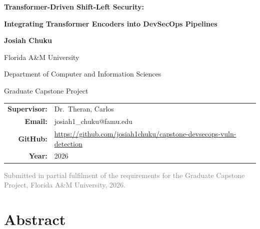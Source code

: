 \documentclass[12pt, letterpaper]{article}
\begin{document}
\begin{titlepage}
\centering\vspace*{2cm}
{\Huge\bfseries\color{navyblue} Transformer-Driven Shift-Left Security:\par}
\vspace{0.5cm}
{\LARGE\bfseries\color{navyblue}
  Integrating Transformer Encoders into DevSecOps Pipelines\par}
\vspace{2cm}
{\large\bfseries Josiah Chuku\par}\vspace{0.3cm}
{\large Florida A\&M University\par}
{\large Department of Computer and Information Sciences\par}
{\large Graduate Capstone Project\par}
\vspace{1.5cm}
{\normalsize\begin{tabular}{rl}
  \textbf{Supervisor:} & Dr.\ Theran, Carlos \\[6pt]
  \textbf{Email:}      & josiah1\_chuku@famu.edu \\[6pt]
  \textbf{GitHub:}     &
    \url{https://github.com/josiah1chuku/capstone-devsecops-vuln-detection} \\[6pt]
  \textbf{Year:}       & 2026 \\
\end{tabular}\par}
\vfill
{\small\textcolor{gray}{Submitted in partial fulfilment of the requirements
  for the Graduate Capstone Project, Florida A\&M University, 2026.}\par}
\end{titlepage}

\tableofcontents\newpage
\listoffigures\listoftables\newpage

\section*{Abstract}
\end{document}

